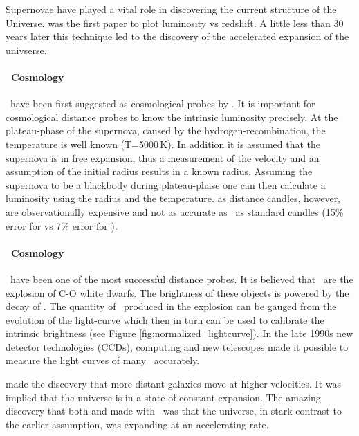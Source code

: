 Supernovae have played a vital role in discovering the current structure of the Universe. \citet{1968AJ.....73.1021K} was the first paper to plot luminosity vs redshift. A little less than 30 years later this technique led to the discovery of the accelerated expansion of the univserse.

\paragraph{\snii\ Cosmology}
\sniip\ have been first suggested as cosmological probes by \citet{1974ApJ...193...27K}. It is important for cosmological distance probes to know the intrinsic luminosity precisely. At the plateau-phase of the supernova, caused by the hydrogen-recombination,  the temperature is well known (T=5000\,K). In addition it is assumed that the supernova is in free expansion, thus a measurement of the velocity and an assumption of the initial radius results in a known radius. Assuming the supernova to be a blackbody during plateau-phase one can then calculate a luminosity using the radius and the temperature. \sniip as distance candles, however, are observationally expensive and not as accurate as \snia\ as standard candles (15\% error for \snii  \citep{2006ApJ...645..841N} vs 7\% error for \snia).

\paragraph{\snia\ Cosmology}
\sneia\ have been one of the most successful distance probes. It is believed that \sneia\ are the explosion of C-O white dwarfs. The brightness of these objects is powered by the decay of \Ni. The quantity of \Ni\ produced in the explosion can be gauged from the evolution of the light-curve which then in turn can be used to calibrate the intrinsic brightness (see Figure \ref{fig:normalized_lightcurve}).
In the late 1990s new detector technologies (CCDs), computing and new telescopes made it possible to measure the light curves of many \sneia\ accurately. 

\citet{1929PNAS...15..168H} made the discovery that more distant galaxies move at higher velocities. It was implied that the universe is in a state of constant expansion. The amazing discovery that both \citet{1998AJ....116.1009R} and \citet{1999ApJ...517..565P} made with \sneia\ was that the universe, in stark contrast to the earlier assumption, was expanding at an accelerating rate. 


